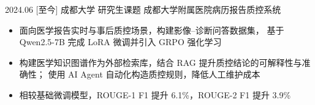 \documentclass[zh]{resume}
\begin{document}
\begin{projects}
{\begin{itemize}
      \end{itemize}
    }
  \separator{0.35ex}
  \project%
    {2024.06}%
    [至今]%
    {成都大学}%
    {研究生课题}%
    {成都大学附属医院病历报告质控系统}%
    {%
      \begin{itemize}
        \item 面向医学报告实时与事后质控场景，构建影像--诊断问答数据集，
          基于 Qwen2.5-7B 完成 LoRA 微调并引入 GRPO 强化学习
        \item 构建医学知识图谱作为外部检索库，结合 RAG 提升质控结论的可解释性与准确性；
          使用 AI Agent 自动化构造质控规则，降低人工维护成本
        \item 相较基础微调模型，ROUGE-1 F1 提升 6.1\%，ROUGE-2 F1 提升 3.9\%
      \end{itemize}
    }
\end{projects}
\endgroup
\end{document}

